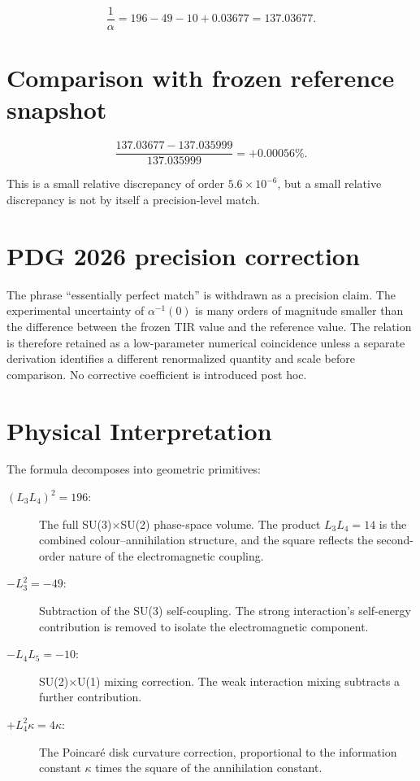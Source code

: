 \[
\frac{1}{\alpha} = 196 - 49 - 10 + 0.03677 = 137.03677.
\]

\section{Comparison with frozen reference snapshot}

\[
\frac{137.03677 - 137.035999}{137.035999} = +0.00056\%.
\]

This is a small relative discrepancy of order \(5.6\times10^{-6}\), but a
small relative discrepancy is not by itself a precision-level match.

\section{PDG 2026 precision correction}
The phrase ``essentially perfect match'' is withdrawn as a precision claim.
The experimental uncertainty of $\alpha^{-1}(0)$ is many orders of magnitude
smaller than the difference between the frozen TIR value and the reference
value.  The relation is therefore retained as a low-parameter numerical
coincidence unless a separate derivation identifies a different renormalized
quantity and scale before comparison.  No corrective coefficient is introduced
post hoc.

\section{Physical Interpretation}

The formula decomposes into geometric primitives:

\begin{description}
\item[\((L_3 L_4)^2 = 196\):] The full SU(3)\(\times\)SU(2) phase-space
volume.  The product \(L_3 L_4 = 14\) is the combined colour--annihilation
structure, and the square reflects the second-order nature of the
electromagnetic coupling.
\item[\(-L_3^2 = -49\):] Subtraction of the SU(3) self-coupling.  The
strong interaction's self-energy contribution is removed to isolate the
electromagnetic component.
\item[\(-L_4 L_5 = -10\):] SU(2)\(\times\)U(1) mixing correction.  The
weak interaction mixing subtracts a further contribution.
\item[\(+L_4^2\kappa = 4\kappa\):] The Poincar\'{e} disk curvature
correction, proportional to the information constant \(\kappa\) times the
square of the annihilation constant.
\end{description}
